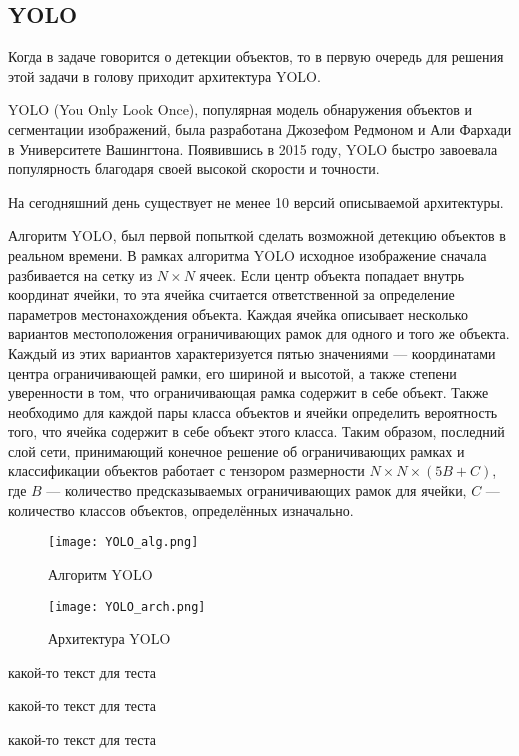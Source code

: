 \documentclass[../document.tex]{subfiles}
\begin{document}
    \subsection{YOLO}
    \par Когда в задаче говорится о детекции объектов, то в первую очередь для решения этой задачи в голову приходит архитектура YOLO.
    \par YOLO (You Only Look Once), популярная модель обнаружения объектов и сегментации изображений, была разработана Джозефом Редмоном и Али Фархади в Университете Вашингтона. Появившись в 2015 году, YOLO быстро завоевала популярность благодаря своей высокой скорости и точности.
    \par На сегодняшний день существует не менее 10 версий описываемой архитектуры.
    \par Алгоритм YOLO, был первой попыткой сделать возможной детекцию объектов в реальном времени. В рамках алгоритма YOLO исходное изображение сначала разбивается на сетку из $N×N$ ячеек. Если центр объекта попадает внутрь координат ячейки, то эта ячейка считается ответственной за определение параметров местонахождения объекта. Каждая ячейка описывает несколько вариантов местоположения ограничивающих рамок для одного и того же объекта. Каждый из этих вариантов характеризуется пятью значениями — координатами центра ограничивающей рамки, его шириной и высотой, а также степени уверенности в том, что ограничивающая рамка содержит в себе объект. Также необходимо для каждой пары класса объектов и ячейки определить вероятность того, что ячейка содержит в себе объект этого класса. Таким образом, последний слой сети, принимающий конечное решение об ограничивающих рамках и классификации объектов работает с тензором размерности $N×N×(5B+C)$, где $B$ — количество предсказываемых ограничивающих рамок для ячейки, $C$ — количество классов объектов, определённых изначально.
    
    \begin{figure}[H]
    	\centering
    	\texttt{[image: YOLO\_alg.png]}
    	\caption{Алгоритм YOLO}
    	
    	\texttt{[image: YOLO\_arch.png]}
    	\caption{Архитектура YOLO}
	\end{figure}
	
	\par какой-то текст для теста
	\par какой-то текст для теста
	\par какой-то текст для теста
\end{document}
